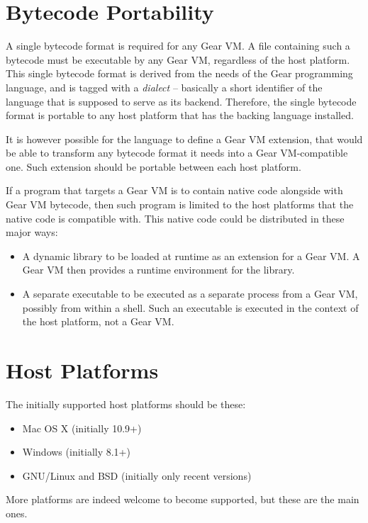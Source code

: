 \section{Bytecode Portability}

A single bytecode format is required for any Gear VM. A file containing such a bytecode must be executable by any Gear VM, regardless of the host platform. This single bytecode format is derived from the needs of the Gear programming language, and is tagged with a {\em dialect} -- basically a short identifier of the language that is supposed to serve as its backend. Therefore, the single bytecode format is portable to any host platform that has the backing language installed. 

It is however possible for the language to define a Gear VM extension, that would be able to transform any bytecode format it needs into a Gear VM-compatible one. Such extension should be portable between each host platform. 

If a program that targets a Gear VM is to contain native code alongside with Gear VM bytecode, then such program is limited to the host platforms that the native code is compatible with. This native code could be distributed in these major ways: 
\begin{itemize}
\item A dynamic library to be loaded at runtime as an extension for a Gear VM. A Gear VM then provides a runtime environment for the library. 
\item A separate executable to be executed as a separate process from a Gear VM, possibly from within a shell. Such an executable is executed in the context of the host platform, not a Gear VM. 
\end{itemize}





\section{Host Platforms}

The initially supported host platforms should be these:
\begin{itemize}
\item Mac OS X (initially 10.9+)
\item Windows (initially 8.1+)
\item GNU/Linux and BSD (initially only recent versions)
\end{itemize}

More platforms are indeed welcome to become supported, but these are the main ones. 






